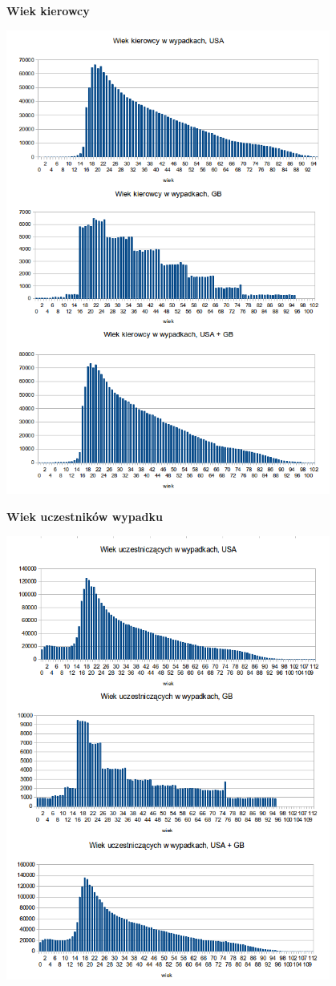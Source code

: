 \textbf{Wiek kierowcy}

\centerline{\includegraphics[width=0.8\textwidth]{images/statistics/driver_age.png}}

\textbf{Wiek uczestników wypadku}

\centerline{\includegraphics[width=0.8\textwidth]{images/statistics/person_age.png}}

